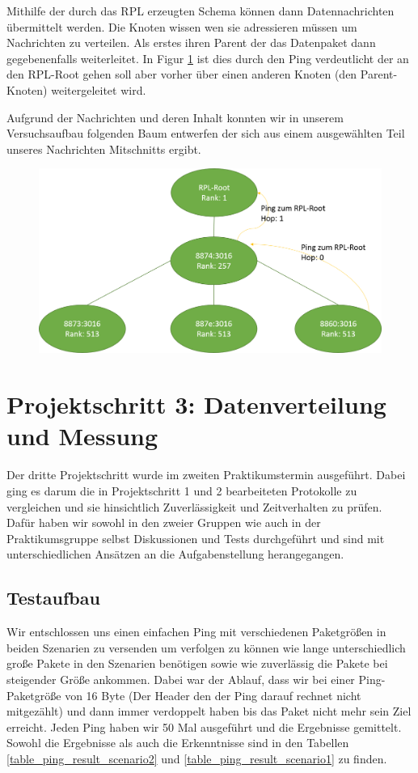 \documentclass[]{scrartcl}
\begin{document}
Mithilfe der durch das RPL erzeugten Schema können dann Datennachrichten übermittelt werden. Die Knoten wissen wen sie adressieren müssen um Nachrichten zu verteilen. Als erstes ihren Parent der das Datenpaket dann gegebenenfalls weiterleitet. In Figur \ref{fig:RPL_Baum}  ist dies durch den Ping verdeutlicht der an den RPL-Root gehen soll aber vorher über einen anderen Knoten (den Parent-Knoten) weitergeleitet wird.

Aufgrund der Nachrichten und deren Inhalt konnten wir in unserem Versuchsaufbau folgenden Baum entwerfen der sich aus einem ausgewählten Teil unseres Nachrichten Mitschnitts ergibt.

\begin{figure}[H]
	\centering
	\includegraphics[width=1\linewidth]{RPL_Baum.png}
	\label{fig:RPL_Baum}
\end{figure}


\section{Projektschritt 3: Datenverteilung und Messung}
Der dritte Projektschritt wurde im zweiten Praktikumstermin ausgeführt. Dabei ging es darum die in Projektschritt 1 und 2 bearbeiteten Protokolle zu vergleichen und sie hinsichtlich Zuverlässigkeit und Zeitverhalten zu prüfen. Dafür haben wir sowohl in den zweier Gruppen wie auch in der Praktikumsgruppe selbst Diskussionen und Tests durchgeführt und sind mit unterschiedlichen Ansätzen an die Aufgabenstellung herangegangen.

\subsection{Testaufbau}
Wir entschlossen uns einen einfachen Ping mit verschiedenen Paketgrößen in beiden Szenarien zu versenden um verfolgen zu können wie lange unterschiedlich große Pakete in den Szenarien benötigen sowie wie zuverlässig die Pakete bei steigender Größe ankommen.
Dabei war der Ablauf, dass wir bei einer Ping-Paketgröße von 16 Byte (Der Header den der Ping darauf rechnet nicht mitgezählt) und dann immer verdoppelt haben bis das Paket nicht mehr sein Ziel erreicht. Jeden Ping haben wir 50 Mal ausgeführt und die Ergebnisse gemittelt. Sowohl die Ergebnisse als auch die Erkenntnisse sind in den Tabellen \ref{table_ping_result_scenario2} und \ref{table_ping_result_scenario1} zu finden.
\end{document}
